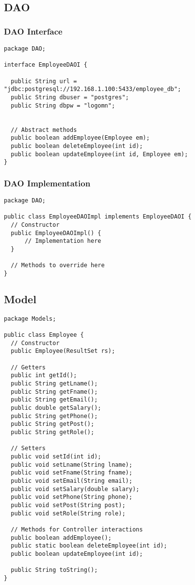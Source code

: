\documentclass[12pt]{article}
\begin{document}
\pagebreak

\subsection{DAO}
\subsubsection{DAO Interface}
\begin{lstlisting}
package DAO;

interface EmployeeDAOI {
  
  public String url = "jdbc:postgresql://192.168.1.100:5433/employee_db";
  public String dbuser = "postgres";
  public String dbpw = "logomn";


  // Abstract methods
  public boolean addEmployee(Employee em);
  public boolean deleteEmployee(int id);
  public boolean updateEmployee(int id, Employee em);
}
\end{lstlisting}

\subsubsection{DAO Implementation}
\begin{lstlisting}
package DAO;

public class EmployeeDAOImpl implements EmployeeDAOI {
  // Constructor
  public EmployeeDAOImpl() {
      // Implementation here
  }
  
  // Methods to override here
}
\end{lstlisting}

\pagebreak

\subsection{Model}
\begin{lstlisting}
package Models;

public class Employee {
  // Constructor
  public Employee(ResultSet rs);
  
  // Getters
  public int getId();
  public String getLname();
  public String getFname();
  public String getEmail();
  public double getSalary();
  public String getPhone();
  public String getPost();
  public String getRole();

  // Setters
  public void setId(int id);
  public void setLname(String lname);
  public void setFname(String fname);
  public void setEmail(String email);
  public void setSalary(double salary);
  public void setPhone(String phone);
  public void setPost(String post);
  public void setRole(String role);

  // Methods for Controller interactions
  public boolean addEmployee();
  public static boolean deleteEmployee(int id);
  public boolean updateEmployee(int id);

  public String toString();
}
\end{lstlisting}
\end{document}
